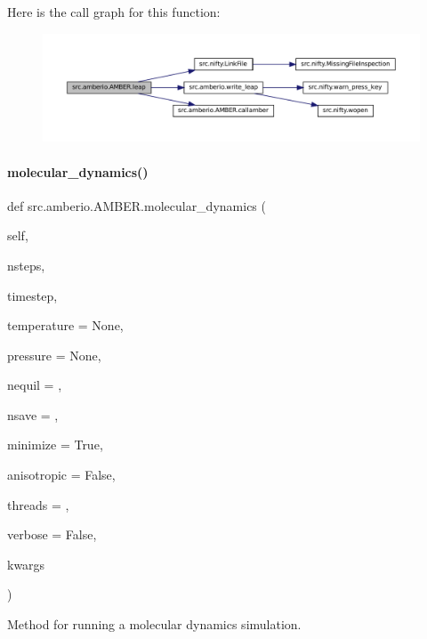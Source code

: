 Here is the call graph for this function\+:
\nopagebreak
\begin{figure}[H]
\begin{center}
\leavevmode
\includegraphics[width=350pt]{classsrc_1_1amberio_1_1AMBER_a8cb2d1848fd4fa90dd2998e38592a21e_cgraph}
\end{center}
\end{figure}
\mbox{\label{classsrc_1_1amberio_1_1AMBER_a8fa5737ac517637eeb8b53426eba46dd}} 
\paragraph{\texorpdfstring{molecular\+\_\+dynamics()}{molecular\_dynamics()}}
{\footnotesize\ttfamily def src.\+amberio.\+A\+M\+B\+E\+R.\+molecular\+\_\+dynamics (\begin{DoxyParamCaption}\item[{}]{self,  }\item[{}]{nsteps,  }\item[{}]{timestep,  }\item[{}]{temperature = {\ttfamily None},  }\item[{}]{pressure = {\ttfamily None},  }\item[{}]{nequil = {},  }\item[{}]{nsave = {},  }\item[{}]{minimize = {\ttfamily True},  }\item[{}]{anisotropic = {\ttfamily False},  }\item[{}]{threads = {},  }\item[{}]{verbose = {\ttfamily False},  }\item[{}]{kwargs }\end{DoxyParamCaption})}



Method for running a molecular dynamics simulation. 

